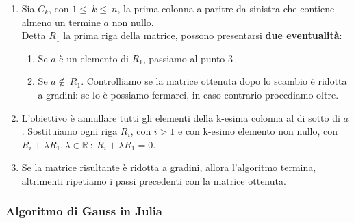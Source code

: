 \documentclass{article}
\begin{document}
\begin{enumerate}
    \item Sia $C_k$, con $1\leq\ k\leq\ n$, la prima colonna a paritre da sinistra che contiene almeno un termine $a$ non nullo.\\
          Detta $R_1$ la prima riga della matrice, possono presentarsi\textbf{ due eventualità}:
          \begin{enumerate}
              \item Se $a$ è un elemento di $R_1$, passiamo al punto $3$
              \item Se $a\notin\ R_1$. Controlliamo se la matrice ottenuta dopo lo scambio è ridotta a gradini: se lo è possiamo fermarci, in caso contrario procediamo oltre.
          \end{enumerate}
    \item L'obiettivo è annullare tutti gli elementi della k-esima colonna al di sotto di $a$. Sostituiamo ogni riga $R_i$, con $i>1$ e con k-esimo elemento non nullo, con $R_i+\lambda R_1, \lambda\in\mathbb{R} \ : \ R_i+\lambda R_1 = 0$.
    \item Se la matrice risultante è ridotta a gradini, allora l'algoritmo termina, altrimenti ripetiamo i passi precedenti con la matrice ottenuta.
\end{enumerate}

\subsubsection{Algoritmo di Gauss in Julia}
\end{document}
